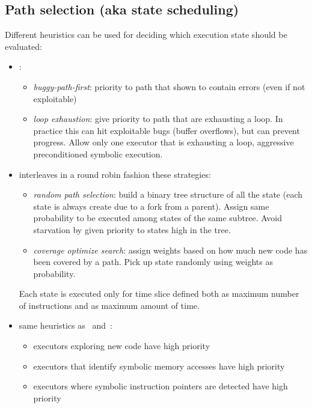 \documentclass[10pt, a4paper]{article}
\begin{document}
\subsection{Path selection (aka state scheduling)}
Different heuristics can be used for deciding which execution state should be evaluated:
\begin{itemize}

  \item \cite{AEG-NDSS11}:
  \begin{itemize}
    \item {\em buggy-path-first}: priority to path that shown to contain errors (even if not exploitable)
    \item {\em loop exhaustion}: give priority to path that are exhausting a loop. In practice this can hit exploitable bugs (buffer overflows), but can prevent progress. Allow only one executor that is exhausting a loop, aggressive preconditioned symbolic execution.
  \end{itemize}

  \item \cite{KLEE-OSDI08} interleaves in a round robin fashion these strategies:
  \begin{itemize}
    \item {\em random path selection}: build a binary tree structure of all the state (each state is always create due to a fork from a parent). Assign same probability to be executed among states of the same subtree. Avoid starvation by given priority to states high in the tree.
    \item {\em coverage optimize search}: assign weights based on how much new code has been covered by a path. Pick up state randomly using weights as probability.
  \end{itemize}
  Each state is executed only for time slice defined both as maximum number of instructions and as maximum amount of time.

  \item \cite{MAYHEM-SP12} same heuristics as~\cite{SAGE-NDSS08} and~\cite{KLEE-OSDI08}:
  \begin{itemize}
    \item executors exploring new code have high priority
    \item executors that identify symbolic memory accesses have high priority
    \item executors where symbolic instruction pointers are detected have high priority
  \end{itemize}
\end{itemize}
\end{document}
